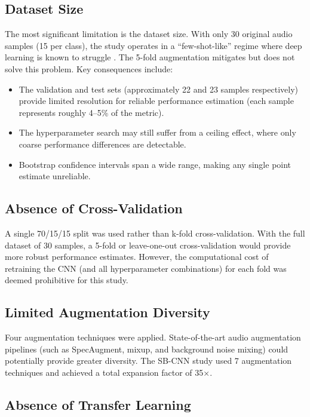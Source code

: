 \documentclass[12pt,a4paper,oneside]{report}
\begin{document}
\subsection{Dataset Size}

The most significant limitation is the dataset size. With only 30 original audio samples (15 per class), the study operates in a ``few-shot-like'' regime where deep learning is known to struggle \cite{sbcnn2016,zhang2019}. The 5-fold augmentation mitigates but does not solve this problem. Key consequences include:

\begin{itemize}
    \item The validation and test sets (approximately 22 and 23 samples respectively) provide limited resolution for reliable performance estimation (each sample represents roughly 4--5\% of the metric).
    \item The hyperparameter search may still suffer from a ceiling effect, where only coarse performance differences are detectable.
    \item Bootstrap confidence intervals span a wide range, making any single point estimate unreliable.
\end{itemize}

\subsection{Absence of Cross-Validation}

A single 70/15/15 split was used rather than k-fold cross-validation. With the full dataset of 30 samples, a 5-fold or leave-one-out cross-validation would provide more robust performance estimates. However, the computational cost of retraining the CNN (and all hyperparameter combinations) for each fold was deemed prohibitive for this study.

\subsection{Limited Augmentation Diversity}

Four augmentation techniques were applied. State-of-the-art audio augmentation pipelines (such as SpecAugment, mixup, and background noise mixing) could potentially provide greater diversity. The SB-CNN study \cite{sbcnn2016} used 7 augmentation techniques and achieved a total expansion factor of 35×.

\subsection{Absence of Transfer Learning}
\end{document}
